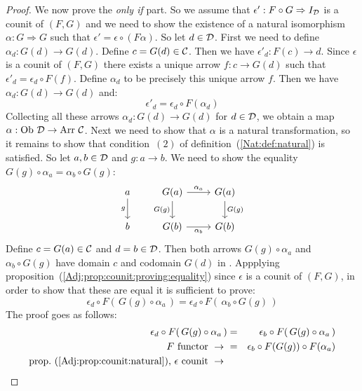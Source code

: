 \begin{proof}
    We now prove the {\em only if} part. So we assume that 
    $\epsilon':F\circ G\Rightarrow I_{\cal D}$ is a counit of $(F,G)$ and we need
    to show the existence of a natural isomorphism $\alpha:G\Rightarrow G$
    such that $\epsilon'=\epsilon\circ(F\alpha)$. So let $d\in\mbox{$\cal D$}$. First we need
    to define $\alpha_{d}:G(d)\to G(d)$. Define $c=G(d)\in\mbox{$\cal C$}$. Then we 
    have $\epsilon'_{d}:F(c)\to d$. Since $\epsilon$ is a counit of $(F,G)$ 
    there exists a unique arrow $f:c\to G(d)$ such that $\epsilon'_{d}
    =\epsilon_{d}\circ F(f)$.
    Define $\alpha_{d}$ to be precisely this unique arrow $f$. Then we 
    have $\alpha_{d}:G(d)\to G(d)$ and:
        \begin{equation}\label{Adj:eqn:counit:not:unique}
            \epsilon'_{d}=\epsilon_{d}\circ F(\alpha_{d})
        \end{equation}
    Collecting all these arrows $\alpha_{d}:G(d)\to G(d)$ for $d\in\mbox{$\cal D$}$,
    we obtain a map $\alpha:\mbox{\rm Ob}\ \mbox{$\cal D$}\to\mbox{\rm Arr}\ \mbox{$\cal C$}$. Next we need to show 
    that $\alpha$ is a natural transformation, so it remains to show that
    condition~$(2)$ of definition~(\ref{Nat:def:natural}) is satisfied. So
    let $a,b\in\mbox{$\cal D$}$ and $g:a\to b$. We need to show the equality
    $G(g)\circ\alpha_{a}=\alpha_{b}\circ G(g)$:
    \[
        \begin{tikzcd}
            a\arrow[d,swap, "g"]
            &G(a)\arrow[r, "\alpha_{a}"]\arrow[d, swap,"G(g)"]
            &G(a)\arrow[d, "G(g)"]
            \\
            b
            &G(b)\arrow[r, swap, "\alpha_{b}"]
            &G(b)
        \end{tikzcd}
    \]
    Define $c=G(a)\in\mbox{$\cal C$}$ and $d=b\in\mbox{$\cal D$}$. Then both arrows 
    $G(g)\circ\alpha_{a}$ and $\alpha_{b}\circ G(g)$ have domain $c$ and
    codomain $G(d)$ in \Cat. Appplying 
    proposition~(\ref{Adj:prop:counit:proving:equality}) 
    since $\epsilon$ is a counit of $(F,G)$, in order to show that these are equal
    it is sufficient to prove:
        \[
            \epsilon_{d}\circ F(\,G(g)\circ\alpha_{a}\,)=
            \epsilon_{d}\circ F(\,\alpha_{b}\circ G(g)\,)
        \]
    The proof goes as follows:
        \begin{eqnarray*}\epsilon_{d}\circ F(\,G(g)\circ\alpha_{a}\,)
            &=&\epsilon_{b}\circ F(\,G(g)\circ\alpha_{a}\,)\\
            \mbox{$F$ functor}\ \to\ 
            &=&\epsilon_{b}\circ F(G(g)) \circ F(\alpha_{a})\\
            \mbox{prop.~(\ref{Adj:prop:counit:natural}), $\epsilon$ counit}\ \to\ 

\end{eqnarray*}
\end{proof}
